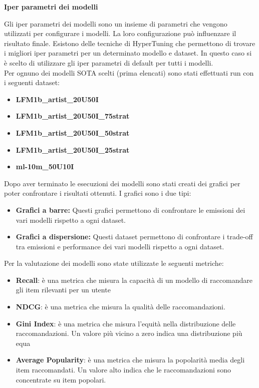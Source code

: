 \noindent \textbf{Iper parametri dei modelli}


\noindent Gli iper parametri dei modelli sono un insieme di parametri che vengono utilizzati per configurare i modelli. La loro configurazione può influenzare il risultato finale. Esistono delle tecniche di HyperTuning che permettono di trovare i migliori iper parametri per un determinato modello e dataset.
In questo caso si è scelto di utilizzare gli iper parametri di default per tutti i modelli.\\Per ognuno dei modelli SOTA scelti (prima elencati) sono stati effettuati run con i seguenti dataset:
\begin{itemize}
    \item \textbf{LFM1b\_artist\_20U50I}
    \item \textbf{LFM1b\_artist\_20U50I\_75strat}
    \item \textbf{LFM1b\_artist\_20U50I\_50strat}
    \item \textbf{LFM1b\_artist\_20U50I\_25strat}
    \item \textbf{ml-10m\_50U10I}
\end{itemize}

\noindent Dopo aver terminato le esecuzioni dei modelli sono stati creati dei grafici per poter confrontare i risultati ottenuti. I grafici sono i due tipi:
\begin{itemize}
    \item \textbf{Grafici a barre:} Questi grafici permettono di confrontare le emissioni dei vari modelli rispetto a ogni dataset.
    \item \textbf{Grafici a dispersione:} Questi dataset permettono di confrontare i trade-off tra emissioni e performance dei vari modelli rispetto a ogni dataset.
\end{itemize}

\noindent Per la valutazione dei modelli sono state utilizzate le seguenti metriche:
\begin{itemize}
    \item \textbf{Recall}: è una metrica che misura la capacità di un modello di raccomandare gli item rilevanti per un utente
    \item \textbf{NDCG}: è una metrica che misura la qualità delle raccomandazioni.
    \item \textbf{Gini Index}: è una metrica che misura l'equità nella distribuzione delle raccomandazioni. Un valore più vicino a zero indica una distribuzione più equa
    \item \textbf{Average Popularity}: è una metrica che misura la popolarità media degli item raccomandati. Un valore alto indica che le raccomandazioni sono concentrate su item popolari.
\end{itemize}



